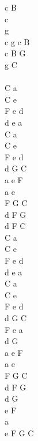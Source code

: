 \documentclass[a5paper, 10pt]{book}
\begin{document}
\begin{minipage}[t]{0.2\textwidth}
  c B\\
  c\\
  g\\
  c g c B\\
  c B G\\
  g C\\
  \\
  C a\\
  C e\\
  F e d\\
  d e a\vspace*{1.5mm}\\
  C a\\
  C e\\
  F e d\\
  d G C\\

  a e F\\
  a e\\
  F G C\\
  d F G\\
  d F C\\

  C a\\
  C e\\
  F e d\\
  d e a\vspace*{1.5mm}\\
  C a\\
  C e\\
  F e d\\
  d G C\\

  F e a\\
  d G\vspace*{1.5mm}\\
  a e F\\
  a e\\
  F G C\\
  d F G\vspace*{1.5mm}\\
  d G\\
  e F\\
  a\\
  e F G C\\
\end{minipage}

\newpage
\end{document}
